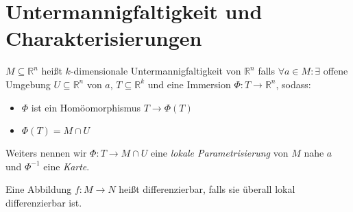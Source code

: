 \section{Untermannigfaltigkeit und Charakterisierungen}
\begin{definition}[Untermannigfaltigkeit]
	$M \subseteq \mathbb R^n$ hei\ss t $k$-dimensionale Untermannigfaltigkeit von $\mathbb R^n$ falls $\forall a\in M: \exists$ offene Umgebung $U\subseteq \mathbb R^n$ von $a$, $T\subseteq \mathbb R^k$ und eine Immersion $\Phi:T\rightarrow \mathbb R^n$, sodass:
	\begin{itemize}
		\item $\Phi$ ist ein Hom\"oomorphismus $T\rightarrow \Phi(T)$
		\item $\Phi(T) = M\cap U$
	\end{itemize}
	
	Weiters nennen wir $\Phi:T \rightarrow M\cap U$ eine \textit{lokale Parametrisierung} von $M$ nahe $a$ und $\Phi^{-1}$ eine \textit{Karte}.
	
	Eine Abbildung $f:M\rightarrow N$ hei\ss t differenzierbar, falls sie \"uberall lokal differenzierbar ist.
\end{definition}


